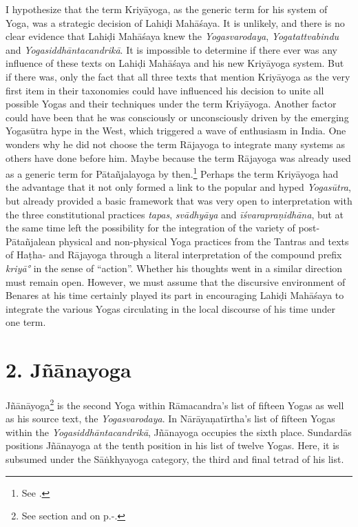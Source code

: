 I hypothesize that the term Kriyāyoga, as the generic term for his system of Yoga, was a strategic decision of Lahiḍi Mahāśaya. It is unlikely, and there is no clear evidence that Lahiḍi Mahāśaya knew the \textit{Yogasvarodaya}, \textit{Yogatattvabindu} and \textit{Yogasiddhāntacandrikā}. It is impossible to determine if there ever was any influence of these texts on Lahiḍi Mahāśaya and his new Kriyāyoga system. But if there was, only the fact that all three texts that mention Kriyāyoga as the very first item in their taxonomies could have influenced his decision to unite all possible Yogas and their techniques under the term Kriyāyoga. Another factor could have been that he was consciously or unconsciously driven by the emerging Yogasūtra hype in the West, which triggered a wave of enthusiasm in India. One wonders why he did not choose the term Rājayoga to integrate many systems as others have done before him. Maybe because the term Rājayoga was already used as a generic term for Pātañjalayoga by then.\footnote{See \citeauthor{birch2014}.} Perhaps the term Kriyāyoga had the advantage that it not only formed a link to the popular and hyped \textit{Yogasūtra}, but already provided a basic framework that was very open to interpretation with the three constitutional practices \textit{tapas}, \textit{svādhyāya} and \textit{īśvarapraṇidhāna}, but at the same time left the possibility for the integration of the variety of post-Pātañjalean physical and non-physical Yoga practices from the Tantras and texts of Haṭha- and Rājayoga through a literal interpretation of the compound prefix \textit{kriyā°} in the sense of ``action''. Whether his thoughts went in a similar direction must remain open. However, we must assume that the discursive  environment of Benares at his time certainly played its part in encouraging Lahiḍi Mahāśaya to integrate the various Yogas circulating in the local discourse of his time under one term.

\section{2. Jñānayoga}
\label{jnanayogaintro}

Jñānāyoga\footnote{See section  and  on p.\pageref{jnanayogastart}-\pageref{endsvabhava}.} is the second Yoga within Rāmacandra's list of fifteen Yogas as well as his source text, the \textit{Yogasvarodaya}. In Nārāyaṇatīrtha's list of fifteen Yogas within the \textit{Yogasiddhāntacandrikā}, Jñānayoga occupies the sixth place. Sundardās positions Jñānayoga at the tenth position in his list of twelve Yogas. Here, it is subsumed under the Sāṅkhyayoga category, the third and final tetrad of his list. 

